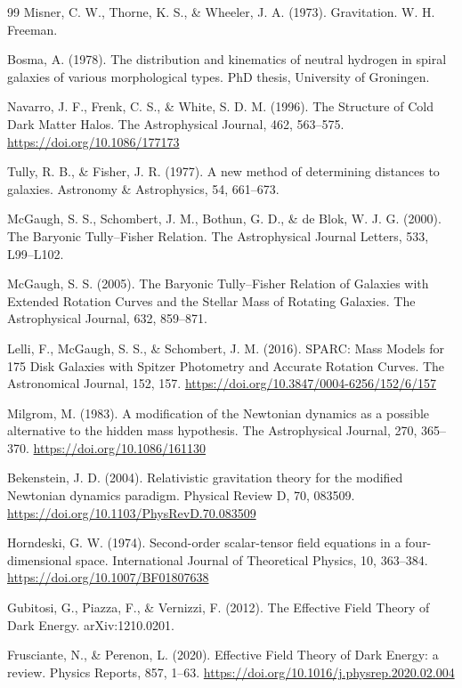 \begin{thebibliography}{99}
		Misner, C. W., Thorne, K. S., \& Wheeler, J. A. (1973). Gravitation. W. H. Freeman.
		
		Bosma, A. (1978). The distribution and kinematics of neutral hydrogen in spiral galaxies of various morphological types. PhD thesis, University of Groningen.
		
		Navarro, J. F., Frenk, C. S., \& White, S. D. M. (1996). The Structure of Cold Dark Matter Halos. The Astrophysical Journal, 462, 563–575. \url{https://doi.org/10.1086/177173}
		
		Tully, R. B., \& Fisher, J. R. (1977). A new method of determining distances to galaxies. Astronomy \& Astrophysics, 54, 661–673.
		
		McGaugh, S. S., Schombert, J. M., Bothun, G. D., \& de Blok, W. J. G. (2000). The Baryonic Tully–Fisher Relation. The Astrophysical Journal Letters, 533, L99–L102.
		
		McGaugh, S. S. (2005). The Baryonic Tully–Fisher Relation of Galaxies with Extended Rotation Curves and the Stellar Mass of Rotating Galaxies. The Astrophysical Journal, 632, 859–871.
		
		Lelli, F., McGaugh, S. S., \& Schombert, J. M. (2016). SPARC: Mass Models for 175 Disk Galaxies with Spitzer Photometry and Accurate Rotation Curves. The Astronomical Journal, 152, 157. \url{https://doi.org/10.3847/0004-6256/152/6/157}
		
		Milgrom, M. (1983). A modification of the Newtonian dynamics as a possible alternative to the hidden mass hypothesis. The Astrophysical Journal, 270, 365–370. \url{https://doi.org/10.1086/161130}
		
		Bekenstein, J. D. (2004). Relativistic gravitation theory for the modified Newtonian dynamics paradigm. Physical Review D, 70, 083509. \url{https://doi.org/10.1103/PhysRevD.70.083509}
		
		Horndeski, G. W. (1974). Second-order scalar-tensor field equations in a four-dimensional space. International Journal of Theoretical Physics, 10, 363–384. \url{https://doi.org/10.1007/BF01807638}
		
		Gubitosi, G., Piazza, F., \& Vernizzi, F. (2012). The Effective Field Theory of Dark Energy. arXiv:1210.0201.
		
		Frusciante, N., \& Perenon, L. (2020). Effective Field Theory of Dark Energy: a review. Physics Reports, 857, 1–63. \url{https://doi.org/10.1016/j.physrep.2020.02.004}
		

\end{thebibliography}
